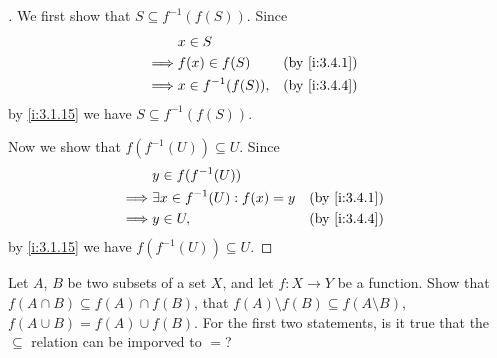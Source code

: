 \begin{proof}[]
  We first show that \(S \subseteq f^{-1}(f(S))\).
  Since
  \begin{align*}
             & x \in S                               \\
    \implies & f(x) \in f(S)       &  & \by{i:3.4.1} \\
    \implies & x \in f^{-1}(f(S)), &  & \by{i:3.4.4}
  \end{align*}
  by \cref{i:3.1.15} we have \(S \subseteq f^{-1}(f(S))\).

  Now we show that \(f(f^{-1}(U)) \subseteq U\).
  Since
  \begin{align*}
             & y \in f(f^{-1}(U))                                   \\
    \implies & \exists x \in f^{-1}(U) : f(x) = y &  & \by{i:3.4.1} \\
    \implies & y \in U,                           &  & \by{i:3.4.4}
  \end{align*}
  by \cref{i:3.1.15} we have \(f(f^{-1}(U)) \subseteq U\).
\end{proof}

\begin{ex}\label{i:ex:3.4.3}
  Let \(A\), \(B\) be two subsets of a set \(X\), and let \(f : X \to Y\) be a function.
  Show that \(f(A \cap B) \subseteq f(A) \cap f(B)\), that \(f(A) \setminus f(B) \subseteq f(A \setminus B)\), \(f(A \cup B) = f(A) \cup f(B)\).
  For the first two statements, is it true that the \(\subseteq\) relation can be imporved to \(=\)?
\end{ex}


